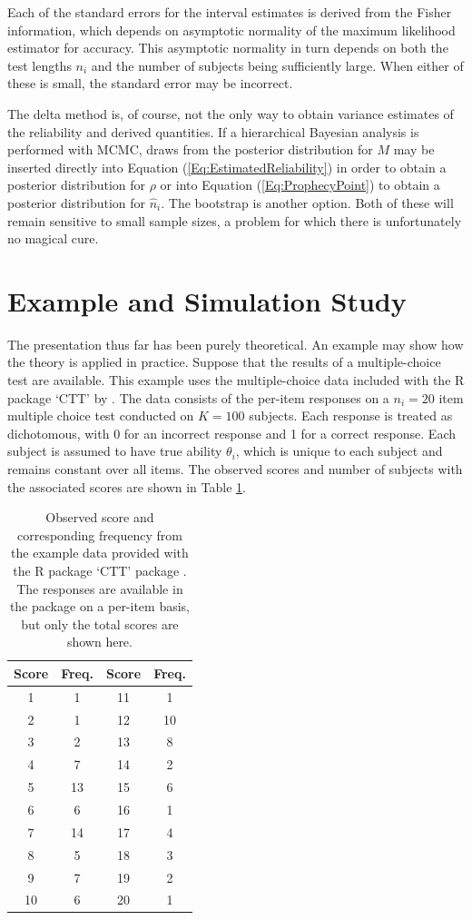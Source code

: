 \documentclass[12pt,epsfig]{article}
\begin{document}
Each of the standard errors for the interval estimates is derived from the Fisher information, which depends on asymptotic normality of the maximum likelihood estimator for accuracy. This asymptotic normality in turn depends on both the test lengths $n_i$ and the number of subjects being sufficiently large. When either of these is small, the standard error may be incorrect. 

The delta method is, of course, not the only way to obtain variance estimates of the reliability and derived quantities. If a hierarchical Bayesian analysis is performed with MCMC, draws from the posterior distribution for $M$ may be inserted directly into Equation (\ref{Eq:EstimatedReliability}) in order to obtain a posterior distribution for $\rho$ or into Equation (\ref{Eq:ProphecyPoint}) to obtain a posterior distribution for $\hat{n}_i$. The bootstrap is another option. Both of these will remain sensitive to small sample sizes, a problem for which there is unfortunately no magical cure.

\section{Example and Simulation Study}
\label{Sec:Example}

The presentation thus far has been purely theoretical. An example may show how the theory is applied in practice. Suppose that the results of a multiple-choice test are available. This example uses the multiple-choice data included with the R package `CTT' by \cite{Willse2018}. The data consists of the per-item responses on a $n_i = 20$ item multiple choice test conducted on $K = 100$ subjects. Each response is treated as dichotomous, with 0 for an incorrect response and 1 for a correct response. Each subject is assumed to have true ability $\theta_i$, which is unique to each subject and remains constant over all items. The observed scores and number of subjects with the associated scores are shown in Table \ref{Table:ExampleData}.


\begin{table}
    \centering
    \begin{tabular}{| c | c ||  c | c |} \hline
    Score & Freq. & Score & Freq. \\ \hline
    1 & 1 & 11 & 1 \\
    2 & 1 & 12 & 10 \\
    3 & 2 & 13 & 8 \\
    4 & 7 & 14 & 2 \\
    5 & 13 & 15 & 6 \\
    6 & 6 & 16 & 1 \\
    7 & 14 & 17 & 4 \\
    8 & 5 & 18 & 3 \\
    9 & 7 & 19 & 2 \\
    10 & 6 & 20 & 1 \\ \hline
    \end{tabular}
\caption{Observed score and corresponding frequency from the example data provided with the R package `CTT' package \cite{Willse2018}. The responses are available in the package on a per-item basis, but only the total scores are shown here.}
\label{Table:ExampleData}
\end{table}
\end{document}
